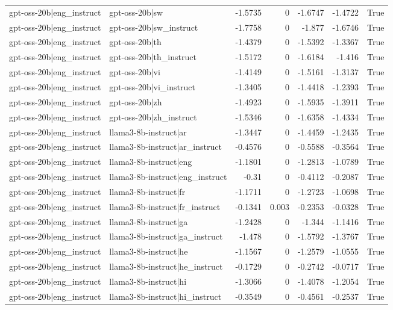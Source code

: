 \begin{table}
\begin{tabular}{l l r r r r l}
gpt-oss-20b|eng_instruct & gpt-oss-20b|sw & -1.5735 & 0 & -1.6747 & -1.4722 & True \\
gpt-oss-20b|eng_instruct & gpt-oss-20b|sw_instruct & -1.7758 & 0 & -1.877 & -1.6746 & True \\
gpt-oss-20b|eng_instruct & gpt-oss-20b|th & -1.4379 & 0 & -1.5392 & -1.3367 & True \\
gpt-oss-20b|eng_instruct & gpt-oss-20b|th_instruct & -1.5172 & 0 & -1.6184 & -1.416 & True \\
gpt-oss-20b|eng_instruct & gpt-oss-20b|vi & -1.4149 & 0 & -1.5161 & -1.3137 & True \\
gpt-oss-20b|eng_instruct & gpt-oss-20b|vi_instruct & -1.3405 & 0 & -1.4418 & -1.2393 & True \\
gpt-oss-20b|eng_instruct & gpt-oss-20b|zh & -1.4923 & 0 & -1.5935 & -1.3911 & True \\
gpt-oss-20b|eng_instruct & gpt-oss-20b|zh_instruct & -1.5346 & 0 & -1.6358 & -1.4334 & True \\
gpt-oss-20b|eng_instruct & llama3-8b-instruct|ar & -1.3447 & 0 & -1.4459 & -1.2435 & True \\
gpt-oss-20b|eng_instruct & llama3-8b-instruct|ar_instruct & -0.4576 & 0 & -0.5588 & -0.3564 & True \\
gpt-oss-20b|eng_instruct & llama3-8b-instruct|eng & -1.1801 & 0 & -1.2813 & -1.0789 & True \\
gpt-oss-20b|eng_instruct & llama3-8b-instruct|eng_instruct & -0.31 & 0 & -0.4112 & -0.2087 & True \\
gpt-oss-20b|eng_instruct & llama3-8b-instruct|fr & -1.1711 & 0 & -1.2723 & -1.0698 & True \\
gpt-oss-20b|eng_instruct & llama3-8b-instruct|fr_instruct & -0.1341 & 0.003 & -0.2353 & -0.0328 & True \\
gpt-oss-20b|eng_instruct & llama3-8b-instruct|ga & -1.2428 & 0 & -1.344 & -1.1416 & True \\
gpt-oss-20b|eng_instruct & llama3-8b-instruct|ga_instruct & -1.478 & 0 & -1.5792 & -1.3767 & True \\
gpt-oss-20b|eng_instruct & llama3-8b-instruct|he & -1.1567 & 0 & -1.2579 & -1.0555 & True \\
gpt-oss-20b|eng_instruct & llama3-8b-instruct|he_instruct & -0.1729 & 0 & -0.2742 & -0.0717 & True \\
gpt-oss-20b|eng_instruct & llama3-8b-instruct|hi & -1.3066 & 0 & -1.4078 & -1.2054 & True \\
gpt-oss-20b|eng_instruct & llama3-8b-instruct|hi_instruct & -0.3549 & 0 & -0.4561 & -0.2537 & True \\

\end{tabular}
\end{table}
